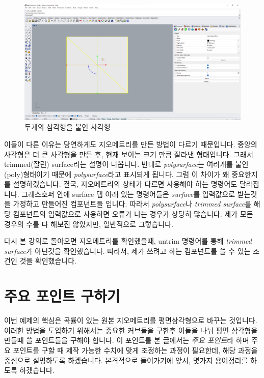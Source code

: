 \documentclass[11pt]{article}
\begin{document}
\begin{figure}[H]
    \includegraphics[width=\textwidth]{./img/mbs_06_PolyRec.png}
    \caption{두개의 삼각형을 붙인 사각형}
    \label{fig:mbs_06_polyRec}
\end{figure}
이들이 다른 이유는 당연하게도 지오메트리를 만든 방법이 다르기 때문입니다. 중앙의 사각형은 더 큰 사각형을 만든 후, 현재 보이는 크기 만큼 잘라낸 형태입니다. 그래서 trimmed(잘린) surface라는 설명이 나옵니다.
반대로 \textit{polysurface}는 여러개를 붙인(poly)형태이기 때문에 \textit{polysurface}라고 표시되게 됩니다. 그럼 이 차이가 왜 중요한지를 설명하겠습니다. 결국, 지오메트리의 상태가 다르면 사용해야 하는 명령어도 달라집니다.
그래스호퍼 안에 surface 탭 아래 있는 명령어들은 \textit{surface}를 입력값으로 받는것을 가정하고 만들어진 컴포넌트들 입니다. 따라서 \textit{polysurface}나 \textit{trimmed surface}를 해당 컴포넌트의 입력값으로 사용하면 
오류가 나는 경우가 상당히 많습니다. 제가 모든 경우의 수를 다 해보진 않았지만, 일반적으로 그렇습니다. 

다시 본 강의로 돌아오면 지오메트리를 확인했을때, untrim 명령어를 통해 \textit{trimmed surface}가 아닌것을 확인했습니다. 따라서, 제가 쓰려고 하는 컴포넌트를 쓸 수 있는 조건인 것을 확인했습니다.
\pagebreak

\section{주요 포인트 구하기}
이번 예제의 핵심은 곡률이 있는 원본 지오메트리를 평면삼각형으로 바꾸는 것입니다. 이러한 방법을 도입하기 위해서는 중요한 커브들을 구한후 이들을 나눠 평면 삼각형을 만들때 쓸 포인트들을 구해야 합니다. 이 포인트를 본 글에서는 \textit{주요 포인트}라 하며 주요 포인트를 구할 때 제작 가능한 수치에 맞게 조정하는 과정이 필요한데,
 해당 과정을 중심으로 설명하도록 하겠습니다. 본격적으로 들어가기에 앞서, 몇가지 용어정리를 하도록 하겠습니다. 
\end{document}
